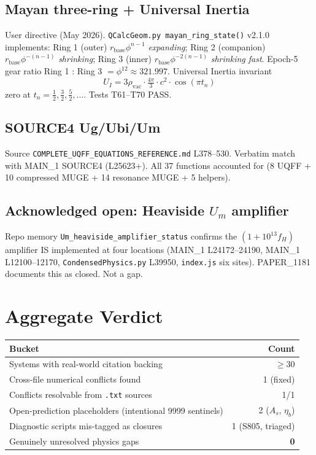 \documentclass[11pt]{article}
\begin{document}
\subsection{Mayan three-ring + Universal Inertia}
User directive (May 2026). \texttt{QCalcGeom.py mayan\_ring\_state()} v2.1.0 implements: Ring 1 (outer) $r_{\mathrm{base}}\phi^{n-1}$ \emph{expanding}; Ring 2 (companion) $r_{\mathrm{base}}\phi^{-(n-1)}$ \emph{shrinking}; Ring 3 (inner) $r_{\mathrm{base}}\phi^{-2(n-1)}$ \emph{shrinking fast}. Epoch-5 gear ratio Ring 1 : Ring 3 $= \phi^{12} \approx 321.997$. Universal Inertia invariant
\[
  U_I = 3\rho_{\mathrm{vac}}\cdot\tfrac{4\pi}{3}\cdot c^2\cdot\cos(\pi t_n)
\]
zero at $t_n = \tfrac12, \tfrac32, \tfrac52, \ldots$. Tests T61--T70 PASS.

\subsection{SOURCE4 Ug/Ubi/Um}
Source \texttt{COMPLETE\_UQFF\_EQUATIONS\_REFERENCE.md} L378--530. Verbatim match with MAIN\_1 SOURCE4 (L25623+). All 37 functions accounted for (8 UQFF + 10 compressed MUGE + 14 resonance MUGE + 5 helpers).

\subsection{Acknowledged open: Heaviside $U_m$ amplifier}
Repo memory \texttt{Um\_heaviside\_amplifier\_status} confirms the $(1 + 10^{13} f_H)$ amplifier IS implemented at four locations (MAIN\_1 L24172--24190, MAIN\_1 L12100--12170, \texttt{CondensedPhysics.py} L39950, \texttt{index.js} six sites). PAPER\_1181 documents this as closed. Not a gap.

\section{Aggregate Verdict}
\begin{longtable}{lr}
\toprule
Bucket & Count \\
\midrule
Systems with real-world citation backing & $\geq 30$ \\
Cross-file numerical conflicts found & 1 (fixed) \\
Conflicts resolvable from \texttt{.txt} sources & 1/1 \\
Open-prediction placeholders (intentional 9999 sentinels) & 2 ($A_s$, $\eta_b$) \\
Diagnostic scripts mis-tagged as closures & 1 (S805, triaged) \\
Genuinely unresolved physics gaps & \textbf{0} \\
\bottomrule
\end{longtable}
\end{document}
